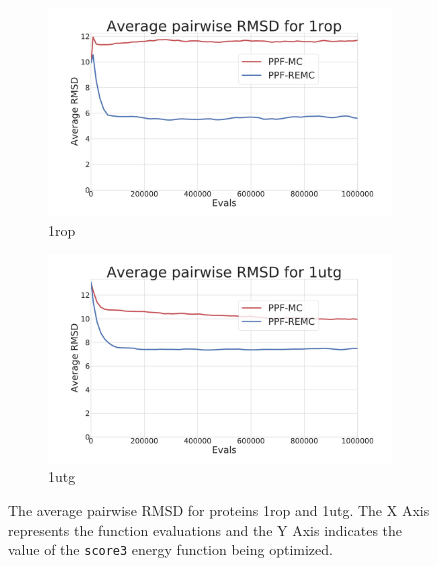 \begin{figure}[ht]
  \begin{subfigure}{0.499\linewidth}
    \centering
    \includegraphics[width=1\linewidth]{Figuras/plots/rmsd_convergence/avg_rmsd_1rop.pdf}
    \caption{1rop}
    \label{fig:1rop-rmsd-convergence}
  \end{subfigure}
%
  \begin{subfigure}{0.499\linewidth}
    \centering
    \includegraphics[width=1\linewidth]{Figuras/plots/rmsd_convergence/avg_rmsd_1utg.pdf}
    \caption{1utg}
    \label{fig:1utg-rmsd-convergence}
  \end{subfigure}
  \caption{The average pairwise RMSD for proteins 1rop and 1utg.
  The X Axis represents the function evaluations and
  the Y Axis indicates the value of the \texttt{score3} energy function being
  optimized.}
  \label{fig:rmsd-convergence-1rop-1utg}
\end{figure}

